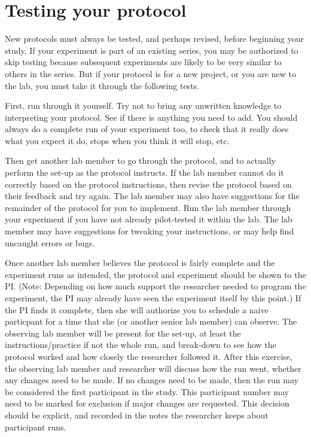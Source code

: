 \documentclass[12pt,]{book}
\theoremstyle{definition}
\theoremstyle{definition}
\theoremstyle{definition}
\theoremstyle{remark}
\begin{document}
\section{Testing your protocol}\label{testing-your-protocol}

New protocols must always be tested, and perhaps revised, before
beginning your study. If your experiment is part of an existing series,
you may be authorized to skip testing because subsequent experiments are
likely to be very similar to others in the series. But if your protocol
is for a new project, or you are new to the lab, you must take it
through the following tests.

First, run through it yourself. Try not to bring any unwritten knowledge
to interpreting your protocol. See if there is anything you need to add.
You should always do a complete run of your experiment too, to check
that it really does what you expect it do, stops when you think it will
stop, etc.

Then get another lab member to go through the protocol, and to actually
perform the set-up as the protocol instructs. If the lab member cannot
do it correctly based on the protocol instructions, then revise the
protocol based on their feedback and try again. The lab member may also
have suggestions for the remainder of the protocol for you to implement.
Run the lab member through your experiment if you have not already
pilot-tested it within the lab. The lab member may have suggestions for
tweaking your instructions, or may help find uncaught errors or bugs.

Once another lab member believes the protocol is fairly complete and the
experiment runs as intended, the protocol and experiment should be shown
to the PI. (Note: Depending on how much support the researcher needed to
program the experiment, the PI may already have seen the experiment
itself by this point.) If the PI finds it complete, then she will
authorize you to schedule a naive particpant for a time that she (or
another senior lab member) can observe. The observing lab member will be
present for the set-up, at least the instructions/practice if not the
whole run, and break-down to see how the protocol worked and how closely
the researcher followed it. After this exercise, the observing lab
member and researcher will discuss how the run went, whether any changes
need to be made. If no changes need to be made, then the run may be
considered the first participant in the study. This participant number
may need to be marked for exclusion if major changes are requested. This
decision should be explicit, and recorded in the notes the researcher
keeps about participant runs.
\end{document}
